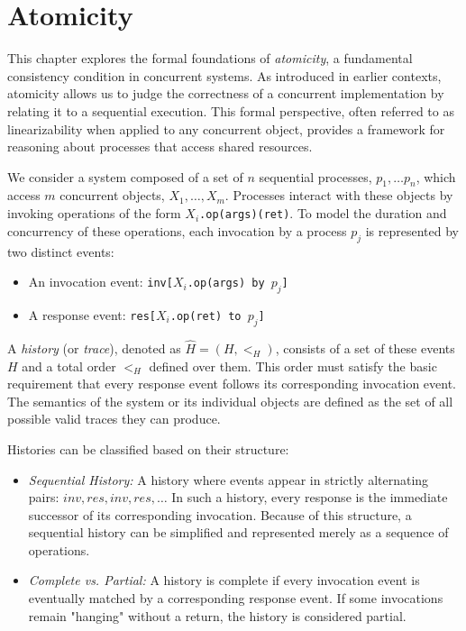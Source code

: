 \chapter{Atomicity}
This chapter explores the formal foundations of \textit{atomicity}, a fundamental consistency condition in concurrent systems. As introduced in earlier contexts, atomicity allows us to judge the correctness of a concurrent implementation by relating it to a sequential execution. This formal perspective, often referred to as linearizability when applied to any concurrent object, provides a framework for reasoning about processes that access shared resources.

We consider a system composed of a set of $n$ sequential processes, $p_1,\ldots p_n$, which access $m$ concurrent objects, $X_1,\dots,X_m$. Processes interact with these objects by invoking operations of the form $X_i$\texttt{.op(args)(ret)}. To model the duration and concurrency of these operations, each invocation by a process $p_j$ is represented by two distinct events:
\begin{itemize}
    \item An invocation event: \texttt{inv[}$X_i$\texttt{.op(args) by }$p_j$\texttt{]}
    \item A response event: \texttt{res[}$X_i$\texttt{.op(ret) to }$p_j$\texttt{]}
\end{itemize}

A \textit{history} (or \textit{trace}), denoted as $\widehat{H}=(H,<_H)$, consists of a set of these events $H$ and a total order $<_H$ defined over them. This order must satisfy the basic requirement that every response event follows its corresponding invocation event. The semantics of the system or its individual objects are defined as the set of all possible valid traces they can produce.

Histories can be classified based on their structure:
\begin{itemize}
    \item \textit{Sequential History:} A history where events appear in strictly alternating pairs: $inv,res,inv,res,\ldots$ In such a history, every response is the immediate successor of its corresponding invocation. Because of this structure, a sequential history can be simplified and represented merely as a sequence of operations.
    \item \textit{Complete vs. Partial:} A history is complete if every invocation event is eventually matched by a corresponding response event. If some invocations remain "hanging" without a return, the history is considered partial.
\end{itemize}

